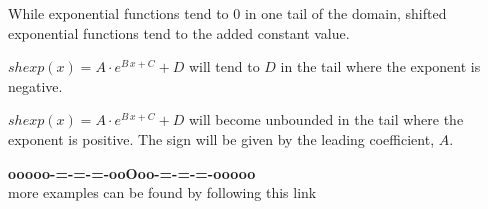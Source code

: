 \documentclass{ximera}
\begin{document}
While exponential functions tend to $0$ in one tail of the domain, shifted exponential functions tend to the added constant value. 



$shexp(x) = A \cdot e^{B \, x + C} + D$ will tend to $D$ in the tail where the exponent is negative. 


$shexp(x) = A \cdot e^{B \, x + C} + D$ will become unbounded in the tail where the exponent is positive.  The sign will be given by the leading coefficient, $A$. 









\begin{center}
\textbf{\textcolor{green!50!black}{ooooo-=-=-=-ooOoo-=-=-=-ooooo}} \\

more examples can be found by following this link\\ 

\end{center}
\end{document}

